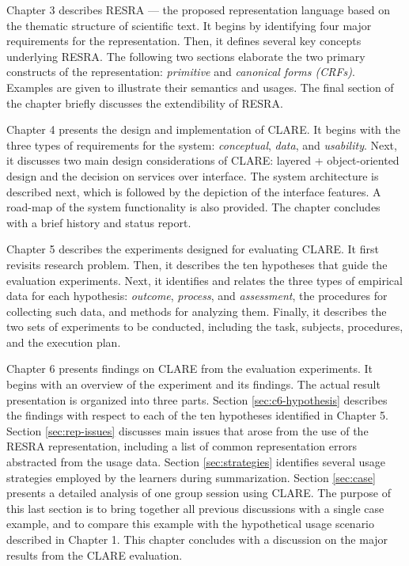 Chapter 3 describes RESRA --- the proposed representation language based on
the thematic structure of scientific text. It begins by identifying four
major requirements for the representation. Then, it defines several key
concepts underlying RESRA. The following two sections elaborate the two
primary constructs of the representation: {\it primitive\/} and {\it
canonical forms (CRFs)}. Examples are given to illustrate their semantics
and usages. The final section of the chapter briefly discusses the
extendibility of RESRA.

Chapter 4 presents the design and implementation of CLARE. It begins with
the three types of requirements for the system: {\it conceptual\/}, {\it
data\/}, and {\it usability\/}. Next, it discusses two main design
considerations of CLARE: layered + object-oriented design and the decision
on services over interface. The system architecture is described next,
which is followed by the depiction of the interface features. A road-map of
the system functionality is also provided. The chapter concludes with a
brief history and status report.

Chapter 5 describes the experiments designed for evaluating CLARE. It first
revisits research problem. Then, it describes the ten hypotheses that guide
the evaluation experiments. Next, it identifies and relates the three types
of empirical data for each hypothesis: {\it outcome\/}, {\it process\/},
and {\it assessment}, the procedures for collecting such data, and methods
for analyzing them. Finally, it describes the two sets of experiments to be
conducted, including the task, subjects, procedures, and the execution
plan.

Chapter 6 presents findings on CLARE from the evaluation experiments. It
begins with an overview of the experiment and its findings. The actual
result presentation is organized into three parts. Section
\ref{sec:c6-hypothesis} describes the findings with respect to each of the
ten hypotheses identified in Chapter 5. Section \ref{sec:rep-issues}
discusses main issues that arose from the use of the RESRA representation,
including a list of common representation errors abstracted from the usage
data. Section \ref{sec:strategies} identifies several usage strategies
employed by the learners during summarization.  Section \ref{sec:case}
presents a detailed analysis of one group session using CLARE. The purpose
of this last section is to bring together all previous discussions with a
single case example, and to compare this example with the hypothetical
usage scenario described in Chapter 1. This chapter concludes with a
discussion on the major results from the CLARE evaluation.

